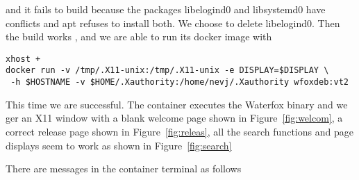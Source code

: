 \documentclass[a4paper]{article}  %
\begin{document}
and it fails to build because the packages libelogind0 and libsystemd0 have conflicts and apt refuses to install both. We choose to delete libelogind0. 
Then the build works , and we are able to run its docker image with
\begin{tcolorbox}
\begin{verbatim}
xhost +
docker run -v /tmp/.X11-unix:/tmp/.X11-unix -e DISPLAY=$DISPLAY \
 -h $HOSTNAME -v $HOME/.Xauthority:/home/nevj/.Xauthority wfoxdeb:vt2
\end{verbatim}
\end{tcolorbox}
This time we are successful. The container executes the Waterfox binary and we ger an X11 window with a blank welcome page shown in Figure~\ref{fig:welcom}, a correct release page shown in Figure~\ref{fig:releas}, all the search functions and page displays seem to work as shown in Figure~\ref{fig:search}



There are messages in the container terminal as follows
\end{document}

